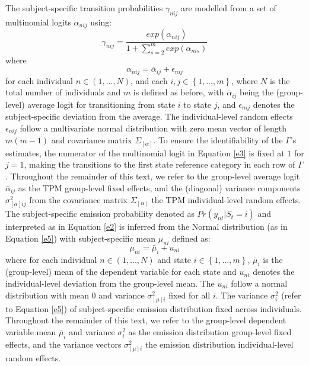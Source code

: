 The subject-specific transition probabilities $\gamma_{nij}$ are modelled from a set of multinomial logits $\alpha_{nij}$ using: 
\begin{equation}\label{e3}
 \gamma_{nij}= \frac{exp(\alpha_{nij})}{1+\sum_{s=2}^{m} exp(\alpha_{nis})}
\end{equation}
where
\begin{equation}
\label{e4}
\alpha_{nij}=\bar{\alpha}_{ij}+\epsilon_{nij} \end{equation}
for each individual ${n\in \left ( 1,..., N\right )}$, and each ${i, j\in \left \{ 1,..., m \right \}}$, where $N$ is the total number of individuals and $m$ is defined as before, with $\bar{\alpha}_{ij}$ being the (group-level) average logit for transitioning from state $i$ to state $j$, and $\epsilon_{nij}$ denotes the subject-specific deviation from the average. The individual-level random effects $\epsilon_{nij}$ follow a multivariate normal distribution with zero mean vector of length $m(m-1)$ and covariance matrix $\Sigma_{[\alpha]}$.
To ensure the identifiability of the $\Gamma$'s estimates, the numerator of the multinomial logit in Equation \ref{e3} is fixed at $1$ for $j=1$, making the transitions to the first state reference category in each row of $\Gamma$. Throughout the remainder of this text, we refer to the group-level average logit $\bar{\alpha}_{ij}$ as the TPM group-level fixed effects, and the (diagonal) variance components $\sigma^{2}_{[\alpha]ij}$ from the covariance matrix $\Sigma_{[\alpha]}$ the TPM individual-level random effects.
The subject-specific emission probability denoted as $Pr(y_{nt}|S_t=i)$ and interpreted as in Equation \ref{e2} is inferred from the Normal distribution (as in Equation \ref{e5}) with subject-specific mean $\mu_{ni}$ defined as:
\begin{equation}\label{e6}
 \mu_{ni}=\bar{\mu}_{i}+u_{ni}
\end{equation}
where for each individual ${n\in \left ( 1,..., N\right)}$ and state $i\in \left \{ 1,..., m \right \}$, $\bar{\mu}_{i}$ is the (group-level) mean of the dependent variable for each state and $u_{ni}$ denotes the individual-level deviation from the group-level mean. The $u_{ni}$ follow a normal distribution with mean 0 and variance $\sigma^{2}_{[\mu]i}$ fixed for all $i$. The variance $\sigma^{2}_{i}$ (refer to Equation \ref{e5}) of subject-specific emission distribution fixed across individuals. Throughout the remainder of this text, we refer to the group-level dependent variable mean $\bar{\mu}_{i}$ and variance $\sigma^{2}_{i}$ as the emission distribution group-level fixed effects, and the variance vectors $\sigma^{2}_{[\mu]i}$ the emission distribution individual-level random effects.

